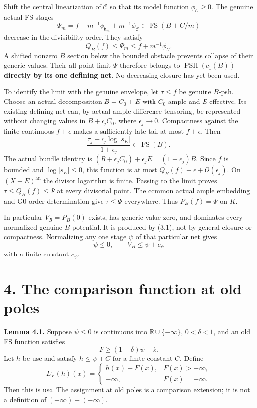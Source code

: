 \documentclass[
  10pt,
]{article}
\begin{document}
Shift the central linearization of \(\mathcal C\) so that its model
function \(\phi_{\mathcal C}\geq0\). The genuine actual FS stages
\[\Psi_m=f+m^{-1}\phi_{\mathfrak b_m}
+m^{-1}\phi_{\mathcal C}
\in\operatorname{FS}(B+C/m)\tag{3.1}\] decrease in the divisibility
order. They satisfy \[Q_B(f)\leq\Psi_m\leq f+m^{-1}\phi_{\mathcal C}.\]
A shifted nonzero \(B\) section below the bounded obstacle prevents
collapse of their generic values. Their all-point limit \(\Psi\)
therefore belongs to \(\operatorname{PSH}(c_1(B))\) \textbf{directly by
its one defining net}. No decreasing closure has yet been used.

To identify the limit with the genuine envelope, let \(\tau\leq f\) be
genuine \(B\)-psh. Choose an actual decomposition \(B=C_0+E\) with
\(C_0\) ample and \(E\) effective. Its existing defining net can, by
actual ample difference tensoring, be represented without changing
values in \(B+\epsilon_jC_0\), where \(\epsilon_j\to0\). Compactness
against the finite continuous \(f+\epsilon\) makes a sufficiently late
tail at most \(f+\epsilon\). Then
\[\frac{\tau_j+\epsilon_j\log|s_E|}{1+\epsilon_j}
\in\operatorname{FS}(B).\] The actual bundle identity is
\((B+\epsilon_jC_0)+\epsilon_jE=(1+\epsilon_j)B\). Since \(f\) is
bounded and \(\log|s_E|\leq0\), this function is at most
\(Q_B(f)+\epsilon+O(\epsilon_j)\). On \((X-E)^{\mathrm{an}}\) the
divisor logarithm is finite. Passing to the limit proves
\(\tau\leq Q_B(f)\leq\Psi\) at every divisorial point. The common actual
ample embedding and G0 order determination give \(\tau\leq\Psi\)
everywhere. Thus \(P_B(f)=\Psi\) on \(K\).

In particular \(V_B=P_B(0)\) exists, has generic value zero, and
dominates every normalized genuine \(B\) potential. It is produced by
(3.1), not by general closure or compactness. Normalizing any one stage
\(\psi\) of that particular net gives
\[\psi\leq0,\qquad V_B\leq\psi+c_\psi\tag{3.2}\] with a finite constant
\(c_\psi\).

\section{4. The comparison function at old
poles}\label{the-comparison-function-at-old-poles}

\textbf{Lemma 4.1.} Suppose \(\psi\leq0\) is continuous into
\(\mathbb R\cup\{-\infty\}\), \(0<\delta<1\), and an old FS function
satisfies \[F\geq(1-\delta)\psi-k.\] Let \(h\) be usc and satisfy
\(h\leq\psi+C\) for a finite constant \(C\). Define \[D_F(h)(x)=
\begin{cases}h(x)-F(x),&F(x)>-\infty,\\
-\infty,&F(x)=-\infty.
\end{cases}\] Then this is usc. The assignment at old poles is a
comparison extension; it is not a definition of \((-\infty)-(-\infty)\).
\end{document}

